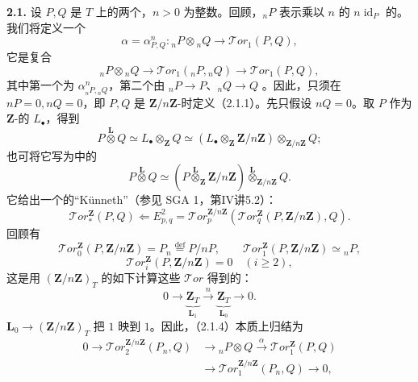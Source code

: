 \textbf{2.1.} 设 $P,Q$ 是 $T$ 上的两个，$n>0$ 为整数。回顾，${}_nP$ 表示乘以 $n$ 的 $n\operatorname{id}_P$ 的。我们将定义一个
\[\alpha=\alpha^n_{P,Q}:{}_nP\otimes{}_nQ\longrightarrow\mathcal Tor_1(P,Q),\tag{2.1.1}\]
它是复合
\[{}_nP\otimes{}_nQ\longrightarrow\mathcal Tor_1({}_nP,{}_nQ)\longrightarrow\mathcal Tor_1(P,Q),\tag{2.1.2}\]
其中第一个为 $\alpha^n_{{}_nP,{}_nQ}$，第二个由 ${}_nP\longrightarrow P$、${}_nQ\longrightarrow Q$ 。因此，只须在 $nP=0,nQ=0$，即 $P,Q$ 是 $\mathbf Z/n\mathbf Z$-时定义（2.1.1）。先只假设 $nQ=0$。取 $P$ 作为 $\mathbf Z$-的 $L_\bullet$，得到
\[P\mathbin{\overset{\mathbf L}{\otimes}}Q\simeq L_\bullet\otimes_{\mathbf Z}Q
\simeq(L_\bullet\otimes_{\mathbf Z}\mathbf Z/n\mathbf Z)\otimes_{\mathbf Z/n\mathbf Z}Q;\]
也可将它写为中的
\[P\mathbin{\overset{\mathbf L}{\otimes}}Q\simeq
(P\mathbin{\overset{\mathbf L}{\otimes}_{\mathbf Z}}\mathbf Z/n\mathbf Z)
\mathbin{\overset{\mathbf L}{\otimes}_{\mathbf Z/n\mathbf Z}}Q.\tag{2.1.3}\]
它给出一个的“Künneth”（参见 SGA 1，第IV讲5.2）：
\[\mathcal Tor_*^{\mathbf Z}(P,Q)\Longleftarrow
E^2_{p,q}=\mathcal Tor_p^{\mathbf Z/n\mathbf Z}(\mathcal Tor_q^{\mathbf Z}(P,\mathbf Z/n\mathbf Z),Q).\tag{2.1.4}\]
回顾有
\[\mathcal Tor_0^{\mathbf Z}(P,\mathbf Z/n\mathbf Z)=P_n\overset{\mathrm{def}}=P/nP,
\qquad\mathcal Tor_1^{\mathbf Z}(P,\mathbf Z/n\mathbf Z)\simeq{}_nP,\]
\[\mathcal Tor_i^{\mathbf Z}(P,\mathbf Z/n\mathbf Z)=0\quad(i\geq2),\]
这是用 $(\mathbf Z/n\mathbf Z)_T$ 的如下计算这些 $\mathcal Tor$ 得到的：
\[0\longrightarrow\underbrace{\mathbf Z_T}_{\mathbf L_1}\xrightarrow{n}
\underbrace{\mathbf Z_T}_{\mathbf L_0}\longrightarrow0.\]
 $\mathbf L_0\longrightarrow(\mathbf Z/n\mathbf Z)_T$ 把 $1$ 映到 $1$。因此，（2.1.4）本质上归结为
\[\begin{split}
0\longrightarrow\mathcal Tor_2^{\mathbf Z/n\mathbf Z}(P_n,Q)&\longrightarrow{}_nP\otimes Q
\xrightarrow{\alpha}\mathcal Tor_1^{\mathbf Z}(P,Q)\\
&\longrightarrow\mathcal Tor_1^{\mathbf Z/n\mathbf Z}(P_n,Q)\longrightarrow0,
\end{split}\tag{2.1.5}\]
